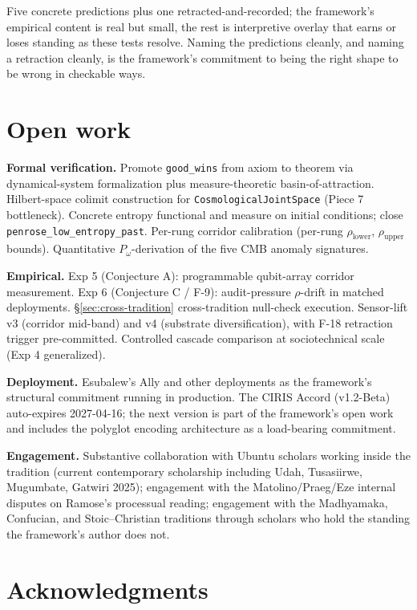 \documentclass[11pt,a4paper]{article}
\newcommand{\Pomega}{P_{\omega}}
\begin{document}
\begin{enumerate}[leftmargin=*,itemsep=4pt]
\end{enumerate}

Five concrete predictions plus one retracted-and-recorded; the framework's empirical content is real but small, the rest is interpretive overlay that earns or loses standing as these tests resolve. Naming the predictions cleanly, and naming a retraction cleanly, is the framework's commitment to being the right shape to be wrong in checkable ways.

\section{Open work}\label{sec:open}

\textbf{Formal verification.} Promote \texttt{good\_wins} from axiom to theorem via dynamical-system formalization plus measure-theoretic basin-of-attraction. Hilbert-space colimit construction for \texttt{CosmologicalJointSpace} (Piece 7 bottleneck). Concrete entropy functional and measure on initial conditions; close \texttt{penrose\_low\_entropy\_past}. Per-rung corridor calibration (per-rung $\rho_{\text{lower}}$, $\rho_{\text{upper}}$ bounds). Quantitative $\Pomega$-derivation of the five CMB anomaly signatures.

\textbf{Empirical.} Exp 5 (Conjecture A): programmable qubit-array corridor measurement. Exp 6 (Conjecture C / F-9): audit-pressure $\rho$-drift in matched deployments. \S\ref{sec:cross-tradition} cross-tradition null-check execution. Sensor-lift v3 (corridor mid-band) and v4 (substrate diversification), with F-18 retraction trigger pre-committed. Controlled cascade comparison at sociotechnical scale (Exp 4 generalized).

\textbf{Deployment.} Esubalew's Ally and other deployments as the framework's structural commitment running in production. The CIRIS Accord (v1.2-Beta) auto-expires 2027-04-16; the next version is part of the framework's open work and includes the polyglot encoding architecture as a load-bearing commitment.

\textbf{Engagement.} Substantive collaboration with Ubuntu scholars working inside the tradition (current contemporary scholarship including Udah, Tusasiirwe, Mugumbate, Gatwiri 2025); engagement with the Matolino/Praeg/Eze internal disputes on Ramose's processual reading; engagement with the Madhyamaka, Confucian, and Stoic--Christian traditions through scholars who hold the standing the framework's author does not.

\section*{Acknowledgments}\label{sec:ack}
\end{document}
